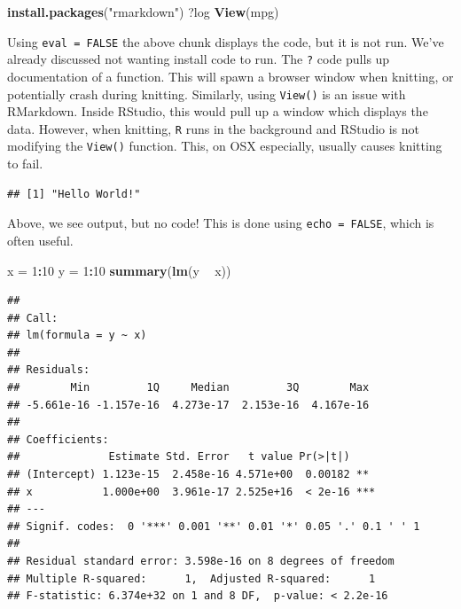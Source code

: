 \documentclass[
]{book}
\newenvironment{Shaded}{\begin{snugshade}}{\end{snugshade}}
\newcommand{\DecValTok}[1]{\textcolor[rgb]{0.00,0.00,0.81}{#1}}
\newcommand{\KeywordTok}[1]{\textcolor[rgb]{0.13,0.29,0.53}{\textbf{#1}}}
\newcommand{\NormalTok}[1]{#1}
\newcommand{\OperatorTok}[1]{\textcolor[rgb]{0.81,0.36,0.00}{\textbf{#1}}}
\newcommand{\StringTok}[1]{\textcolor[rgb]{0.31,0.60,0.02}{#1}}
\begin{document}
\begin{Shaded}
\begin{Highlighting}[]
  \KeywordTok{install.packages}\NormalTok{(}\StringTok{"rmarkdown"}\NormalTok{)}
\NormalTok{  ?log}
  \KeywordTok{View}\NormalTok{(mpg)}
\end{Highlighting}
\end{Shaded}

Using \texttt{eval\ =\ FALSE} the above chunk displays the code, but it is not run. We've already discussed not wanting install code to run. The \texttt{?} code pulls up documentation of a function. This will spawn a browser window when knitting, or potentially crash during knitting. Similarly, using \texttt{View()} is an issue with RMarkdown. Inside RStudio, this would pull up a window which displays the data. However, when knitting, \texttt{R} runs in the background and RStudio is not modifying the \texttt{View()} function. This, on OSX especially, usually causes knitting to fail.

\begin{verbatim}
## [1] "Hello World!"
\end{verbatim}

Above, we see output, but no code! This is done using \texttt{echo\ =\ FALSE}, which is often useful.

\begin{Shaded}
\begin{Highlighting}[]
\NormalTok{  x =}\StringTok{ }\DecValTok{1}\OperatorTok{:}\DecValTok{10}
\NormalTok{  y =}\StringTok{ }\DecValTok{1}\OperatorTok{:}\DecValTok{10}
  \KeywordTok{summary}\NormalTok{(}\KeywordTok{lm}\NormalTok{(y }\OperatorTok{~}\StringTok{ }\NormalTok{x))}
\end{Highlighting}
\end{Shaded}

\begin{verbatim}
## 
## Call:
## lm(formula = y ~ x)
## 
## Residuals:
##        Min         1Q     Median         3Q        Max 
## -5.661e-16 -1.157e-16  4.273e-17  2.153e-16  4.167e-16 
## 
## Coefficients:
##              Estimate Std. Error   t value Pr(>|t|)    
## (Intercept) 1.123e-15  2.458e-16 4.571e+00  0.00182 ** 
## x           1.000e+00  3.961e-17 2.525e+16  < 2e-16 ***
## ---
## Signif. codes:  0 '***' 0.001 '**' 0.01 '*' 0.05 '.' 0.1 ' ' 1
## 
## Residual standard error: 3.598e-16 on 8 degrees of freedom
## Multiple R-squared:      1,  Adjusted R-squared:      1 
## F-statistic: 6.374e+32 on 1 and 8 DF,  p-value: < 2.2e-16
\end{verbatim}
\end{document}
